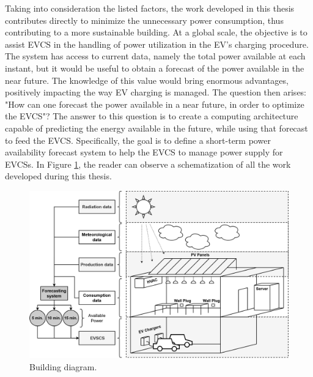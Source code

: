 


 
Taking into consideration the listed factors, the work developed in this thesis contributes directly to minimize the unnecessary power consumption, thus contributing to a more sustainable building. At a global scale, the objective is to assist \ac{EVCS} in the handling of power utilization in the  \ac{EV}'s charging procedure. The system has access to current data, namely the total power available at each instant, but it would be useful to obtain a forecast of the power available in the near future. The knowledge of this value would bring enormous advantages, positively impacting the way \ac{EV} charging is managed. The question then arises: "How can one forecast the power available in a near future, in order to optimize the \ac{EVCS}"? The answer to this question is to create a computing architecture capable of predicting the energy available in the future, while using that forecast to feed the \ac{EVCS}. Specifically, the goal is to define a short-term power availability forecast system to help the \ac{EVCS} to manage power supply for \ac{EVCSs}. In Figure \ref{building}, the reader can observe a schematization of all the work developed during this thesis. 

\begin{figure}[h!]
    \centering
    \begin{center}
    \includegraphics[width=1\textwidth]{Images/BUILDING.png}
    \caption{Building diagram.}
    \label{building}
    \end{center}
\end{figure}

